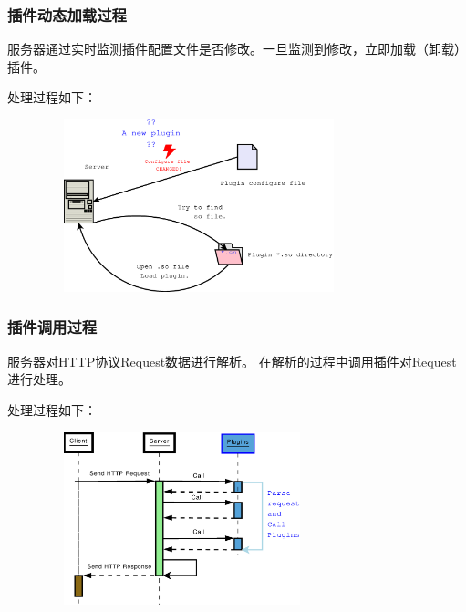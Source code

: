 \documentclass[10pt,dvipdfm]{beamer}
\begin{document}
\begin{frame}
	\frametitle{插件动态加载过程}
	
	服务器通过实时监测插件配置文件是否修改。一旦监测到修改，立即加载（卸载）插件。
	
	\pause
	
	\begin{block}{处理过程如下：}
	\begin{figure}[htbp]
	\centering
	\includegraphics[height=5cm, width=9cm]{loadplugin.eps}
	\end{figure}
	\end{block}
\end{frame}

\begin{frame}
	\frametitle{插件调用过程}
	服务器对HTTP协议Request数据进行解析。	在解析的过程中调用插件对Request进行处理。
	
	\pause
	
	\begin{block}{处理过程如下：}
	\begin{figure}[htbp]
	\centering
	\includegraphics[height=5cm, width=8cm]{httpplugin.eps}
	\end{figure}
	\end{block}
\end{frame}
\end{document}

